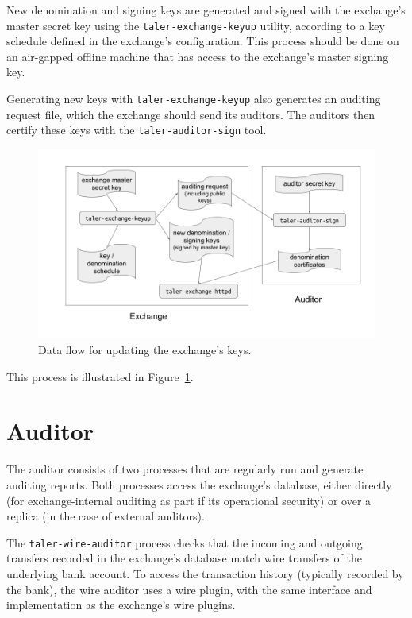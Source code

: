 New denomination and signing keys are generated and signed with the exchange's master
secret key using the \texttt{taler-exchange-keyup} utility, according to a key schedule
defined in the exchange's configuration.  This process should be done on an air-gapped
offline machine that has access to the exchange's master signing key.

Generating new keys with \texttt{taler-exchange-keyup} also generates an
auditing request file, which the exchange should send its auditors.  The auditors then
certify these keys with the \texttt{taler-auditor-sign} tool.

\begin{figure}
    \includegraphics[width=\textwidth]{diagrams/taler-diagram-keyup.png}
    \caption{Data flow for updating the exchange's keys.}
    \label{figure:keyup}
\end{figure}

This process is illustrated in Figure~\ref{figure:keyup}.

\section{Auditor}
The auditor consists of two processes that are regularly run and generate
auditing reports.  Both processes access the exchange's database, either
directly (for exchange-internal auditing as part if its operational security)
or over a replica (in the case of external auditors).

The \texttt{taler-wire-auditor} process checks that the incoming and outgoing
transfers recorded in the exchange's database match wire transfers of the
underlying bank account.  To access the transaction history (typically recorded
by the bank), the wire auditor uses a wire plugin, with the same interface and
implementation as the exchange's wire plugins.

